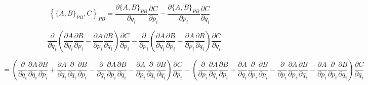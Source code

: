 \documentclass{article}
\begin{document}
\[ \left\{ \{A,B\}_{PB},C \right\}_{PB} =  \frac{\partial \{A,B\}_{PB}}{\partial q_{i}} \frac{\partial C}{\partial p_{i}} - \frac{\partial \{A,B\}_{PB}}{\partial p_{i}} \frac{\partial C}{\partial q_{i}} \]

\[  =  \frac{\partial }{\partial q_{i}}\left(\frac{\partial A}{\partial q_{i}} \frac{\partial B}{\partial p_{i}} - \frac{\partial A}{\partial p_{i}} \frac{\partial B}{\partial q_{i}}\right) \frac{\partial C}{\partial p_{i}} - \frac{\partial }{\partial p_{i}}\left( \frac{\partial A}{\partial q_{i}} \frac{\partial B}{\partial p_{i}} - \frac{\partial A}{\partial p_{i}} \frac{\partial B}{\partial q_{i}} \right) \frac{\partial C}{\partial q_{i}} \]

\[  =  \left(\frac{\partial }{\partial q_{i}}\frac{\partial A}{\partial q_{i}} \frac{\partial B}{\partial p_{i}}
						+\frac{\partial A}{\partial q_{i}} \frac{\partial }{\partial q_{i}}\frac{\partial B}{\partial p_{i}} 
						-\frac{\partial }{\partial q_{i}}\frac{\partial A}{\partial p_{i}} \frac{\partial B}{\partial q_{i}}
						-\frac{\partial A}{\partial p_{i}} \frac{\partial }{\partial q_{i}}\frac{\partial B}{\partial q_{i}}\right) \frac{\partial C}{\partial p_{i}}  
		-	\left(\frac{\partial }{\partial p_{i}}\frac{\partial A}{\partial q_{i}} \frac{\partial B}{\partial p_{i}}
						+\frac{\partial A}{\partial q_{i}} \frac{\partial }{\partial p_{i}}\frac{\partial B}{\partial p_{i}} 
						-\frac{\partial }{\partial p_{i}}\frac{\partial A}{\partial p_{i}} \frac{\partial B}{\partial q_{i}}
						-\frac{\partial A}{\partial p_{i}} \frac{\partial }{\partial p_{i}}\frac{\partial B}{\partial q_{i}}\right) \frac{\partial C}{\partial q_{i}} \]
\end{document}
